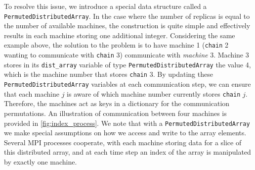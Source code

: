 \medskip 
To resolve this issue, we introduce a special data structure called a 
\texttt{PermutedDistributedArray}. In the case where the number of replicas is 
equal to the number of available machines, the construction is quite simple
and effectively results in each machine storing one additional integer. 
Considering the same example above, the solution to the problem is to have
machine 1 (\texttt{chain} 2 wanting to communicate with \texttt{chain} 3) 
communicate with \textit{machine} 3. 
Machine 3 stores in its \texttt{dist\_array} variable of type 
\texttt{PermutedDistributedArray} the value 4, which is the machine number that 
stores \texttt{chain} 3. By updating these \texttt{PermutedDistributedArray} 
variables at each communication step, we can ensure that each machine $j$ is aware 
of which machine number currently stores \texttt{chain} $j$. 
Therefore, the machines act as keys in a dictionary for the communication 
permutations.
An illustration of communication between four machines is provided in 
\cref{fig:index_process}.
We note that with a \texttt{PermutedDistributedArray} we make special assumptions 
on how we access and write to the array elements. 
Several MPI processes cooperate, with each machine storing 
data for a slice of this distributed array, and at each time 
step an index of the array is manipulated by exactly one machine.

